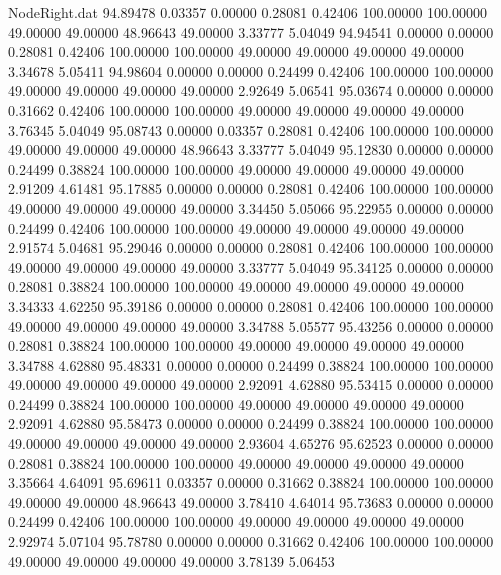 \begin{filecontents}{NodeRight.dat}
  94.89478    0.03357    0.00000     0.28081    0.42406  100.00000  100.00000   49.00000   49.00000   48.96643   49.00000    3.33777    5.04049
  94.94541    0.00000    0.00000     0.28081    0.42406  100.00000  100.00000   49.00000   49.00000   49.00000   49.00000    3.34678    5.05411
  94.98604    0.00000    0.00000     0.24499    0.42406  100.00000  100.00000   49.00000   49.00000   49.00000   49.00000    2.92649    5.06541
  95.03674    0.00000    0.00000     0.31662    0.42406  100.00000  100.00000   49.00000   49.00000   49.00000   49.00000    3.76345    5.04049
  95.08743    0.00000    0.03357     0.28081    0.42406  100.00000  100.00000   49.00000   49.00000   49.00000   48.96643    3.33777    5.04049
  95.12830    0.00000    0.00000     0.24499    0.38824  100.00000  100.00000   49.00000   49.00000   49.00000   49.00000    2.91209    4.61481
  95.17885    0.00000    0.00000     0.28081    0.42406  100.00000  100.00000   49.00000   49.00000   49.00000   49.00000    3.34450    5.05066
  95.22955    0.00000    0.00000     0.24499    0.42406  100.00000  100.00000   49.00000   49.00000   49.00000   49.00000    2.91574    5.04681
  95.29046    0.00000    0.00000     0.28081    0.42406  100.00000  100.00000   49.00000   49.00000   49.00000   49.00000    3.33777    5.04049
  95.34125    0.00000    0.00000     0.28081    0.38824  100.00000  100.00000   49.00000   49.00000   49.00000   49.00000    3.34333    4.62250
  95.39186    0.00000    0.00000     0.28081    0.42406  100.00000  100.00000   49.00000   49.00000   49.00000   49.00000    3.34788    5.05577
  95.43256    0.00000    0.00000     0.28081    0.38824  100.00000  100.00000   49.00000   49.00000   49.00000   49.00000    3.34788    4.62880
  95.48331    0.00000    0.00000     0.24499    0.38824  100.00000  100.00000   49.00000   49.00000   49.00000   49.00000    2.92091    4.62880
  95.53415    0.00000    0.00000     0.24499    0.38824  100.00000  100.00000   49.00000   49.00000   49.00000   49.00000    2.92091    4.62880
  95.58473    0.00000    0.00000     0.24499    0.38824  100.00000  100.00000   49.00000   49.00000   49.00000   49.00000    2.93604    4.65276
  95.62523    0.00000    0.00000     0.28081    0.38824  100.00000  100.00000   49.00000   49.00000   49.00000   49.00000    3.35664    4.64091
  95.69611    0.03357    0.00000     0.31662    0.38824  100.00000  100.00000   49.00000   49.00000   48.96643   49.00000    3.78410    4.64014
  95.73683    0.00000    0.00000     0.24499    0.42406  100.00000  100.00000   49.00000   49.00000   49.00000   49.00000    2.92974    5.07104
  95.78780    0.00000    0.00000     0.31662    0.42406  100.00000  100.00000   49.00000   49.00000   49.00000   49.00000    3.78139    5.06453

\end{filecontents}
